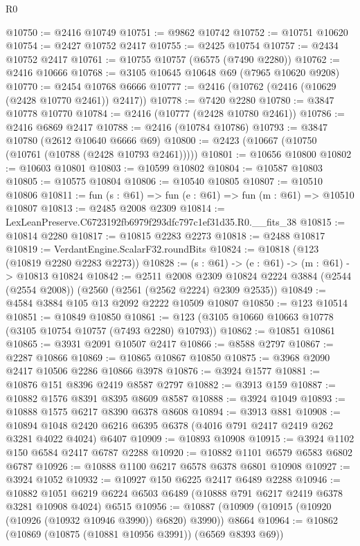 \begin{lexlean}{R0}
\begin{coremodule}
@10750 := @2416 @10749
@10751 := @9862 @10742
@10752 := @10751 @10620
@10754 := @2427 @10752 @2417
@10755 := @2425 @10754
@10757 := @2434 @10752 @2417
@10761 := @10755 @10757 (@6575 (@7490 @2280))
@10762 := @2416 @10666
@10768 := @3105 @10645 @10648 @69 (@7965 @10620 @9208)
@10770 := @2454 @10768 @6666
@10777 := @2416 (@10762 (@2416 (@10629 (@2428 @10770 @2461)) @2417))
@10778 := @7420 @2280
@10780 := @3847 @10778 @10770
@10784 := @2416 (@10777 (@2428 @10780 @2461))
@10786 := @2416 @6869 @2417
@10788 := @2416 (@10784 @10786)
@10793 := @3847 @10780 (@2612 @10640 @6666 @69)
@10800 := @2423 (@10667 (@10750 (@10761 (@10788 (@2428 @10793 @2461)))))
@10801 := @10656 @10800
@10802 := @10603 @10801
@10803 := @10599 @10802
@10804 := @10587 @10803
@10805 := @10575 @10804
@10806 := @10540 @10805
@10807 := @10510 @10806
@10811 := fun (s : @61) => fun (e : @61) => fun (m : @61) => @10510 @10807
@10813 := @2485 @2008 @2309
@10814 := LexLeanPreserve.C6723192fb6979f293dfc797c1ef31d35.R0.__fits_38
@10815 := @10814 @2280
@10817 := @10815 @2283 @2273
@10818 := @2488 @10817
@10819 := VerdantEngine.ScalarF32.roundBits
@10824 := @10818 (@123 (@10819 @2280 @2283 @2273))
@10828 := (s : @61) -> (e : @61) -> (m : @61) -> @10813 @10824
@10842 := @2511
    @2008
    @2309
    @10824
    @2224
    @3884
    (@2544 (@2554 @2008))
    (@2560 (@2561 (@2562 @2224) @2309 @2535))
@10849 := @4584 @3884 @105 @13 @2092 @2222 @10509 @10807
@10850 := @123 @10514
@10851 := @10849 @10850
@10861 := @123 (@3105 @10660 @10663 @10778 (@3105 @10754 @10757 (@7493 @2280) @10793))
@10862 := @10851 @10861
@10865 := @3931 @2091 @10507 @2417
@10866 := @8588 @2797
@10867 := @2287 @10866
@10869 := @10865 @10867 @10850
@10875 := @3968 @2090 @2417 @10506 @2286 @10866 @3978
@10876 := @3924 @1577
@10881 := @10876 @151 @8396 @2419 @8587 @2797
@10882 := @3913 @159
@10887 := @10882 @1576 @8391 @8395 @8609 @8587
@10888 := @3924 @1049
@10893 := @10888 @1575 @6217 @8390 @6378 @8608
@10894 := @3913 @881
@10908 := @10894 @1048 @2420 @6216 @6395 @6378 (@4016 @791 @2417 @2419 @262 @3281 @4022 @4024) @6407
@10909 := @10893 @10908
@10915 := @3924 @1102 @150 @6584 @2417 @6787 @2288
@10920 := @10882 @1101 @6579 @6583 @6802 @6787
@10926 := @10888 @1100 @6217 @6578 @6378 @6801 @10908
@10927 := @3924 @1052
@10932 := @10927 @150 @6225 @2417 @6489 @2288
@10946 := @10882
    @1051
    @6219
    @6224
    @6503
    @6489
    (@10888 @791 @6217 @2419 @6378 @3281 @10908 @4024)
    @6515
@10956 := @10887 (@10909 (@10915 (@10920 (@10926 (@10932 @10946 @3990)) @6820) @3990)) @8664
@10964 := @10862 (@10869 (@10875 (@10881 @10956 @3991)) (@6569 @8393 @69))

\end{coremodule}
\end{lexlean}
